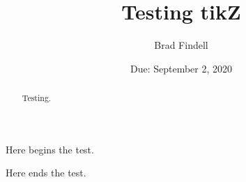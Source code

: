 \documentclass{ximera}
\date{Due: September 2, 2020}
\title{Testing tikZ}
\author{Brad Findell}
\begin{document}
\begin{abstract}
Testing.
\end{abstract}
\maketitle

Here begins the test. 


Here ends the test. 
\end{document}
